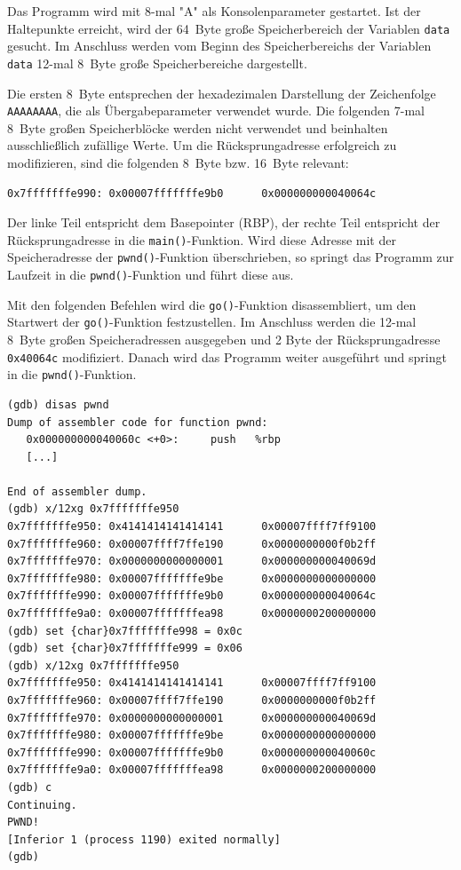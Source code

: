 Das Programm wird mit 8-mal "A" als Konsolenparameter gestartet. Ist der Haltepunkte erreicht, wird der \SI{64}{Byte} große Speicherbereich der Variablen \texttt{data} gesucht. Im Anschluss werden vom Beginn des Speicherbereichs der Variablen \texttt{data} 12-mal \SI{8}{Byte} große Speicherbereiche dargestellt. 

Die ersten \SI{8}{Byte} entsprechen der hexadezimalen Darstellung der Zeichenfolge \texttt{AAAAAAAA}, die als Übergabeparameter verwendet wurde. Die folgenden 7-mal \SI{8}{Byte} großen Speicherblöcke werden nicht verwendet und beinhalten ausschließlich zufällige Werte. Um die Rücksprungadresse erfolgreich zu modifizieren, sind die folgenden \SI{8}{Byte} bzw. \SI{16}{Byte} relevant:

\begin{lstlisting}[basicstyle=\ttfamily\footnotesize]
0x7fffffffe990: 0x00007fffffffe9b0      0x000000000040064c
\end{lstlisting}

Der linke Teil entspricht dem Basepointer (RBP), der rechte Teil entspricht der Rücksprungadresse in die \texttt{main()}-Funktion. Wird diese Adresse mit der Speicheradresse der \texttt{pwnd()}-Funktion überschrieben, so springt das Programm zur Laufzeit in die \texttt{pwnd()}-Funktion und führt diese aus.
 
Mit den folgenden Befehlen wird die \texttt{go()}-Funktion disassembliert, 
um den Startwert der \texttt{go()}-Funktion festzustellen. Im Anschluss 
werden die 12-mal \SI{8}{Byte} großen Speicheradressen 
ausgegeben und 2 Byte der Rücksprungadresse \texttt{0x40064c} modifiziert. 
Danach wird das Programm weiter ausgeführt und springt in die 
\texttt{pwnd()}-Funktion.

\begin{lstlisting}[basicstyle=\ttfamily\footnotesize]
(gdb) disas pwnd
Dump of assembler code for function pwnd:
   0x000000000040060c <+0>:     push   %rbp
   [...]	

End of assembler dump.
(gdb) x/12xg 0x7fffffffe950
0x7fffffffe950: 0x4141414141414141      0x00007ffff7ff9100
0x7fffffffe960: 0x00007ffff7ffe190      0x0000000000f0b2ff
0x7fffffffe970: 0x0000000000000001      0x000000000040069d
0x7fffffffe980: 0x00007fffffffe9be      0x0000000000000000
0x7fffffffe990: 0x00007fffffffe9b0      0x000000000040064c
0x7fffffffe9a0: 0x00007fffffffea98      0x0000000200000000
(gdb) set {char}0x7fffffffe998 = 0x0c
(gdb) set {char}0x7fffffffe999 = 0x06
(gdb) x/12xg 0x7fffffffe950
0x7fffffffe950: 0x4141414141414141      0x00007ffff7ff9100
0x7fffffffe960: 0x00007ffff7ffe190      0x0000000000f0b2ff
0x7fffffffe970: 0x0000000000000001      0x000000000040069d
0x7fffffffe980: 0x00007fffffffe9be      0x0000000000000000
0x7fffffffe990: 0x00007fffffffe9b0      0x000000000040060c
0x7fffffffe9a0: 0x00007fffffffea98      0x0000000200000000
(gdb) c
Continuing.
PWND!
[Inferior 1 (process 1190) exited normally]
(gdb)
\end{lstlisting}

